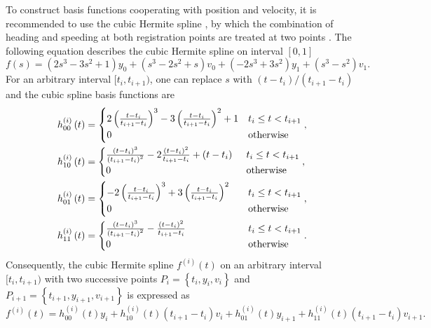To construct basis functions cooperating with position and velocity, it is recommended to use the cubic Hermite spline \citep{Hermite1863Remarque}, by which the combination of heading and speeding at both registration points are treated at two points \citep{hintzen2010improved}. The following equation describes the cubic Hermite spline on interval $[0,1]$
\begin{equation}
f(s)=\left(2s^3-3s^2+1\right)y_0+\left(s^3-2s^2+s\right)v_0+\left(-2s^3+3s^2\right)y_1+\left(s^3-s^2\right)v_1.
\end{equation}
For an arbitrary interval $[t_i, t_{i+1})$, one can replace $s$ with $(t-t_i)/(t_{i+1}-t_i)$ and the cubic spline basis functions are 
\begin{align}\label{hermitebasis1}
& h_{00}^{\left(i\right)}\left(t\right)=
\begin{cases}
2\left(\frac{t-t_{i}}{t_{i+1}-t_{i}}\right)^3-3\left(\frac{t-t_{i}}{t_{i+1}-t_{i}}\right)^2+1 & t_i\leq t<t_{i+1} \\ 
0 & \mbox{otherwise}
\end{cases}, \\
& h_{10}^{\left(i\right)}\left(t\right)=\begin{cases}
\frac{\left(t-t_{i}\right)^3}{\left(t_{i+1}-t_{i}\right)^2}-2\frac{\left(t-t_{i}\right)^2}{t_{i+1}-t_{i}}+\left(t-t_{i}\right)  \hphantom{.}  & t_i\leq t<t_{i+1} \\ 
0 &   \mbox{otherwise}
\end{cases},\\
& h_{01}^{\left(i\right)}\left(t\right)=
\begin{cases}
-2\left(\frac{t-t_i}{t_{i+1}-t_i}\right)^3+3\left(\frac{t-t_i}{t_{i+1}-t_i}\right)^2 \hphantom{+} & t_i\leq t<t_{i+1} \\ 
0 &   \mbox{otherwise}
\end{cases},\\
& h_{11}^{\left(i\right)}\left(t\right)=\begin{cases}
\frac{\left(t-t_i\right)^3}{\left(t_{i+1}-t_i\right)^2}-\frac{\left(t-t_i\right)^2}{t_{i+1}-t_i}  \hphantom{+t-+123-}  & t_i\leq t<t_{i+1} \\ 
0 &   \mbox{otherwise}
\end{cases}.
\end{align}
Consequently, the cubic Hermite spline $f^{(i)}(t)$ on an arbitrary interval $[t_i,t_{i+1})$ with two successive points $P_i=\left\lbrace t_i, y_i,v_i\right\rbrace$ and $P_{i+1}=\left\lbrace t_{i+1}, y_{i+1},v_{i+1} \right\rbrace$ is expressed as
\begin{equation}\label{cubicHermitesplineform}
f^{(i)}(t)=h_{00}^{(i)}(t)y_i+h_{10}^{(i)}(t) \left(t_{i+1}-t_i\right)  v_i+h_{01}^{(i)}(t)y_{i+1} +h_{11}^{(i)}(t)\left(t_{i+1}-t_i\right) v_{i+1}.
\end{equation}

